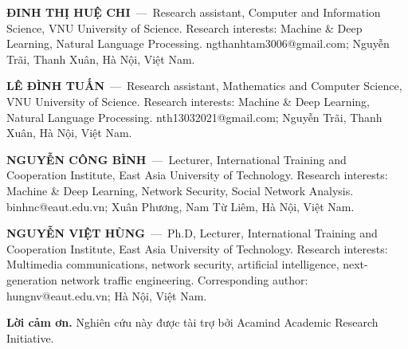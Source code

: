 \documentclass[10pt]{SPIIRAS_Proceedings}
\begin{document}



\begin{aboutAuthors}
    \textbf{ĐINH THỊ HUỆ CHI}~---~Research assistant, Computer and Information Science, VNU University of Science. Research interests: Machine \& Deep Learning, Natural Language Processing. ngthanhtam3006@gmail.com; Nguyễn Trãi, Thanh Xuân, Hà Nội, Việt Nam.\smallskip
    
    \textbf{LÊ ĐÌNH TUẤN}~---~Research assistant, Mathematics and Computer Science, VNU University of Science. Research interests: Machine \& Deep Learning, Natural Language Processing. nth13032021@gmail.com; Nguyễn Trãi, Thanh Xuân, Hà Nội, Việt Nam.\smallskip

    \textbf{NGUYỄN CÔNG BÌNH}~---~Lecturer, International Training and Cooperation Institute, East Asia University of Technology. Research interests: Machine \& Deep Learning, Network Security, Social Network Analysis. binhnc@eaut.edu.vn; Xuân Phương, Nam Từ Liêm, Hà Nội, Việt Nam.\smallskip

    \textbf{NGUYỄN VIỆT HÙNG}~---~Ph.D, Lecturer, International Training and Cooperation Institute, East Asia University of Technology. Research interests: Multimedia communications, network security, artificial intelligence, next-generation network traffic engineering. Corresponding author: hungnv@eaut.edu.vn; Hà Nội, Việt Nam.\smallskip

    \textbf{Lời cảm ơn.} Nghiên cứu này được tài trợ bởi Acamind Academic Research Initiative.
\end{aboutAuthors}
\end{document}
